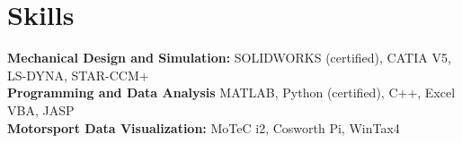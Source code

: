 \documentclass[12pt,letterpaper]{article} %
\begin{document}
\vspace{-18.5pt} %

\section*{Skills}
\textbf{Mechanical Design and Simulation:} SOLIDWORKS (certified), CATIA V5, LS-DYNA, STAR-CCM+ \\
\textbf{Programming and Data Analysis} MATLAB, Python (certified), C++, Excel VBA, JASP \\
\textbf{Motorsport Data Visualization:} MoTeC i2, Cosworth Pi, WinTax4 \\

\vspace{-10.5pt} %






\end{document}
